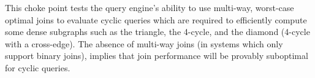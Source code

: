 
This choke point tests the query engine's ability to use multi-way, worst-case
optimal joins to evaluate cyclic queries which are required to efficiently
compute some dense subgraphs such as the triangle, the 4-cycle, and the diamond
(4-cycle with a cross-edge). The absence of multi-way joins (\eg in systems
which only support binary joins), implies that join performance will be provably
suboptimal for cyclic queries.


